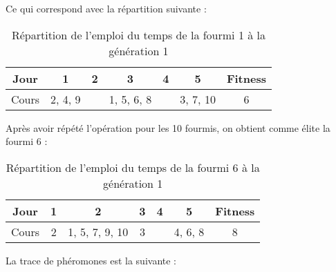 Ce qui correspond avec la répartition suivante :

\begin{table}[H]
    \centering
    \begin{tabular}{|c|c|c|c|c|c|c|}
        \hline
        Jour  & 1       & 2 & 3          & 4 & 5        & Fitness \\
        \hline
        Cours & 2, 4, 9 &   & 1, 5, 6, 8 &   & 3, 7, 10 & 6       \\
        \hline
    \end{tabular}
    \caption{Répartition de l'emploi du temps de la fourmi 1 à la génération 1}\label{tab:fourmi-1-gen-1}
\end{table}

Après avoir répété l'opération pour les 10 fourmis, on obtient comme élite la fourmi 6 :

\begin{table}[!h]
    \centering
    \begin{tabular}{|c|c|c|c|c|c|c|}
        \hline
        Jour  & 1 & 2              & 3 & 4 & 5       & Fitness \\
        \hline
        Cours & 2 & 1, 5, 7, 9, 10 & 3 &   & 4, 6, 8 & 8       \\
        \hline
    \end{tabular}
    \caption{Répartition de l'emploi du temps de la fourmi 6 à la génération 1}\label{tab:fourmi-6-gen-1}
\end{table}

La trace de phéromones est la suivante :

